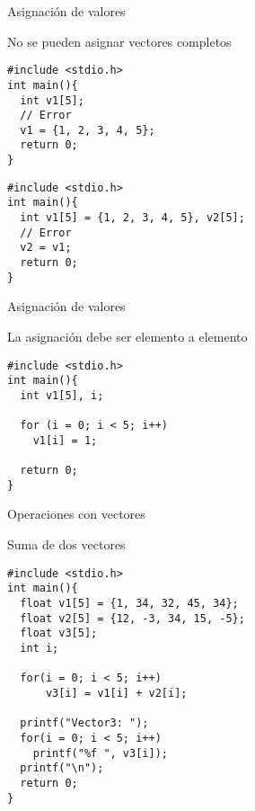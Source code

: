 \documentclass[xcolor={usenames,svgnames,dvipsnames}, aspectratio=169]{beamer}
\begin{document}
\begin{frame}[label={sec:org10fc169},fragile]{Asignación de valores}
 \begin{block}{No se pueden asignar vectores completos}
\lstset{language=C,label= ,caption= ,captionpos=b,numbers=none}
\begin{lstlisting}
#include <stdio.h>
int main(){
  int v1[5];
  // Error
  v1 = {1, 2, 3, 4, 5};
  return 0;
}

\end{lstlisting}

\lstset{language=C,label= ,caption= ,captionpos=b,numbers=none}
\begin{lstlisting}
#include <stdio.h>
int main(){
  int v1[5] = {1, 2, 3, 4, 5}, v2[5];
  // Error
  v2 = v1;
  return 0;
}

\end{lstlisting}
\end{block}
\end{frame}


\begin{frame}[label={sec:orgf3ba38d},fragile]{Asignación de valores}
 \begin{block}{La asignación debe ser elemento a elemento}
\lstset{language=C,label= ,caption= ,captionpos=b,numbers=none}
\begin{lstlisting}
#include <stdio.h>
int main(){
  int v1[5], i;

  for (i = 0; i < 5; i++)
    v1[i] = 1;
  
  return 0;
}

\end{lstlisting}
\end{block}
\end{frame}

\begin{frame}[label={sec:org6057b99},fragile]{Operaciones con vectores}
 \begin{block}{Suma de dos vectores}
\lstset{language=C,label= ,caption= ,captionpos=b,numbers=none}
\begin{lstlisting}
#include <stdio.h>
int main(){
  float v1[5] = {1, 34, 32, 45, 34};
  float v2[5] = {12, -3, 34, 15, -5};
  float v3[5];
  int i;
  
  for(i = 0; i < 5; i++)
      v3[i] = v1[i] + v2[i];

  printf("Vector3: ");
  for(i = 0; i < 5; i++)
    printf("%f ", v3[i]);
  printf("\n");
  return 0;
}
\end{lstlisting}
\end{block}
\end{frame}
\end{document}
